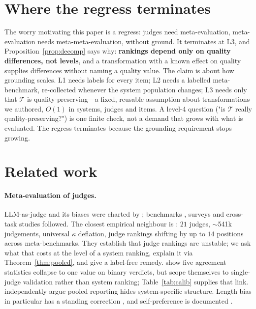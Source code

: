 \documentclass{article}
\theoremstyle{plain}
\theoremstyle{definition}
\begin{document}
\section{Where the regress terminates}
\label{sec:regress}

The worry motivating this paper is a regress: judges need meta-evaluation, meta-evaluation needs
meta-meta-evaluation, without ground. It terminates at L3, and Proposition~\ref{prop:decomp}
says why: \textbf{rankings depend only on quality differences, not levels}, and a transformation
with a known effect on quality supplies differences without naming a quality value. The claim is
about how grounding scales. L1 needs labels for every item; L2 needs a labelled meta-benchmark,
re-collected whenever the system population changes; L3 needs only that $\mathcal{T}$ is
quality-preserving---a fixed, reusable assumption about transformations we authored, $O(1)$ in
systems, judges and items. A level-4 question ("is $\mathcal{T}$ really quality-preserving?") is
one finite check, not a demand that grows with what is evaluated. The regress terminates because
the grounding requirement stops growing.

\section{Related work}

\paragraph{Meta-evaluation of judges.} LLM-as-judge and its biases were charted by
\citet{zheng2023judging}; benchmarks \citep{lambert2024rewardbench,tan2025judgebench,zeng2024llmbar},
surveys \citep{gu2024survey} and cross-task studies \citep{bavaresco2024llms} followed. The
closest empirical neighbour is \citet{norman2026reliability}: $21$ judges, $\sim$541k
judgements, universal $\kappa$ deflation, judge rankings shifting by up to $14$ positions across
meta-benchmarks. They establish that judge rankings are unstable; we ask what that costs at the
level of a system ranking, explain it via Theorem~\ref{thm:pooled}, and give a label-free
remedy. \citet{rao2026agreement} show five agreement statistics collapse to one value on binary
verdicts, but scope themselves to single-judge validation rather than system ranking;
Table~\ref{tab:calib} supplies that link. \citet{pooled2026leaderboards} independently argue
pooled reporting hides system-specific structure. Length bias in particular has a standing
correction \citep{dubois2024length}, and self-preference is documented
\citep{panickssery2024llm}.
\end{document}
